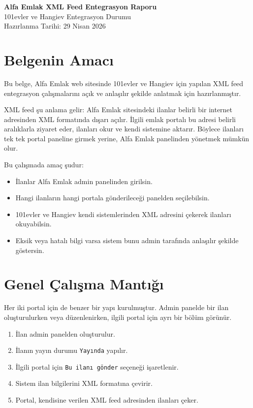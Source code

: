 \documentclass[11pt,a4paper]{article}
\newcommand{\code}[1]{\texttt{#1}}
\begin{document}
\begin{center}
  {\LARGE \textbf{Alfa Emlak XML Feed Entegrasyon Raporu}}\\[0.4cm]
  {\large 101evler ve Hangiev Entegrasyon Durumu}\\[0.2cm]
  {\normalsize Hazırlanma Tarihi: 29 Nisan 2026}
\end{center}

\vspace{0.5cm}

\section{Belgenin Amacı}

Bu belge, Alfa Emlak web sitesinde 101evler ve Hangiev için yapılan XML feed entegrasyon çalışmalarını açık ve anlaşılır şekilde anlatmak için hazırlanmıştır.

XML feed şu anlama gelir: Alfa Emlak sitesindeki ilanlar belirli bir internet adresinden XML formatında dışarı açılır. İlgili emlak portalı bu adresi belirli aralıklarla ziyaret eder, ilanları okur ve kendi sistemine aktarır. Böylece ilanları tek tek portal paneline girmek yerine, Alfa Emlak panelinden yönetmek mümkün olur.

Bu çalışmada amaç şudur:

\begin{itemize}
  \item İlanlar Alfa Emlak admin panelinden girilsin.
  \item Hangi ilanların hangi portala gönderileceği panelden seçilebilsin.
  \item 101evler ve Hangiev kendi sistemlerinden XML adresini çekerek ilanları okuyabilsin.
  \item Eksik veya hatalı bilgi varsa sistem bunu admin tarafında anlaşılır şekilde göstersin.
\end{itemize}

\section{Genel Çalışma Mantığı}

Her iki portal için de benzer bir yapı kurulmuştur. Admin panelde bir ilan oluşturulurken veya düzenlenirken, ilgili portal için ayrı bir bölüm görünür.

\begin{enumerate}
  \item İlan admin panelden oluşturulur.
  \item İlanın yayın durumu \code{Yayında} yapılır.
  \item İlgili portal için \code{Bu ilanı gönder} seçeneği işaretlenir.
  \item Sistem ilan bilgilerini XML formatına çevirir.
  \item Portal, kendisine verilen XML feed adresinden ilanları çeker.
\end{enumerate}
\end{document}
